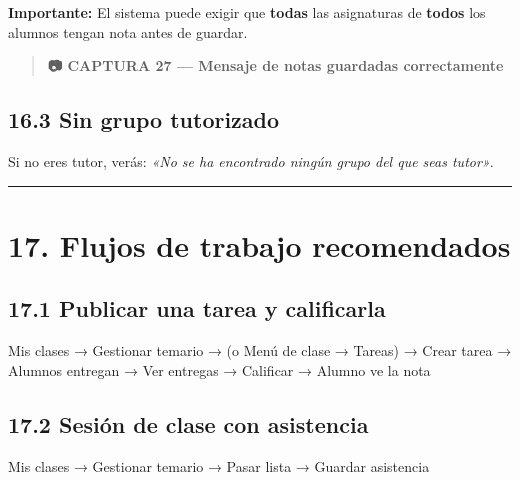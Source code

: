 \documentclass[
  spanish,
  11pt,
]{report}
\newenvironment{Shaded}{}{}
\newcommand{\NormalTok}[1]{#1}
\begin{document}
\textbf{Importante:} El sistema puede exigir que \textbf{todas} las
asignaturas de \textbf{todos} los alumnos tengan nota antes de guardar.

\begin{quote}
\textbf{📷 CAPTURA 27 --- Mensaje de notas guardadas correctamente}
\end{quote}

\subsection{16.3 Sin grupo tutorizado}\label{sin-grupo-tutorizado}

Si no eres tutor, verás: \emph{«No se ha encontrado ningún grupo del que
seas tutor»}.

\begin{center}\rule{0.5\linewidth}{0.5pt}\end{center}

\section{17. Flujos de trabajo
recomendados}\label{flujos-de-trabajo-recomendados}

\subsection{17.1 Publicar una tarea y
calificarla}\label{publicar-una-tarea-y-calificarla}

\begin{Shaded}
\begin{Highlighting}[]
\NormalTok{Mis clases → Gestionar temario → (o Menú de clase → Tareas) → Crear tarea}
\NormalTok{→ Alumnos entregan → Ver entregas → Calificar → Alumno ve la nota}
\end{Highlighting}
\end{Shaded}

\subsection{17.2 Sesión de clase con
asistencia}\label{sesiuxf3n-de-clase-con-asistencia}

\begin{Shaded}
\begin{Highlighting}[]
\NormalTok{Mis clases → Gestionar temario → Pasar lista → Guardar asistencia}
\end{Highlighting}
\end{Shaded}
\end{document}
